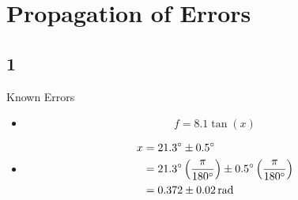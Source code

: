 \documentclass{article}
\begin{document}
\newcommand{\hr}{\par\noindent\rule{\textwidth}{0.4pt}}

\section{Propagation of Errors}

\subsection{1}

Known Errors
\begin{itemize}[label=]
	\item 
		$$ f = 8.1\tan(x) $$
	\item
		\begin{align*}
			x & = 21.3\degree \pm 0.5\degree \\
			  & = 21.3\degree \left(\frac{\pi}{180\degree}\right) \pm 0.5\degree \left(\frac{\pi}{180\degree}\right) \\
			  & = 0.372 \pm \SI{0.02}{\radian}
		\end{align*}
\end{itemize}

\begin{align*}
\end{align*}
\end{document}

